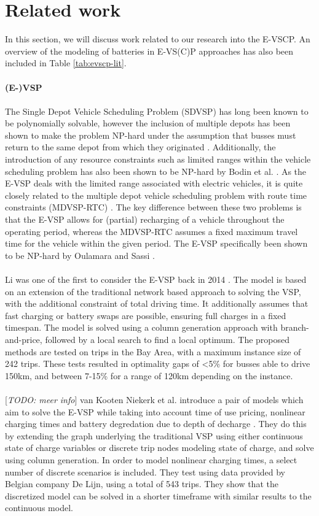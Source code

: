 \documentclass[]{article}
\newcommand{\todo}[1]{{\color{red}[\textit{TODO: #1}]}}
\begin{document}
\section{Related work}
In this section, we will discuss work related to our research into the E-VSCP.  An overview of the modeling of batteries in E-VS(C)P approaches has also been included in Table \ref{tab:evscp-lit}.  \\\\ 
\noindent \textbf{(E-)VSP} \\\\
The Single Depot Vehicle Scheduling Problem (SDVSP) has long been known to be polynomially solvable, however the inclusion of multiple depots has been shown to make the problem NP-hard under the assumption that busses must return to the same depot from which they originated \cite{Bunte2009}. Additionally, the introduction of any resource constraints such as limited ranges within the vehicle scheduling problem has also been shown to be NP-hard by Bodin et al. \cite{BODIN198363}. As the E-VSP deals with the limited range associated with electric vehicles, it is quite closely related to the multiple depot vehicle scheduling problem with route time constraints (MDVSP-RTC) \cite{HAGHANI2002309}. The key difference between these two problems is that the E-VSP allows for (partial) recharging of a vehicle throughout the operating period, whereas the MDVSP-RTC assumes a fixed maximum travel time for the vehicle within the given period. The E-VSP specifically been shown to be NP-hard by Oulamara and Sassi \cite{Sassi2014}. \\\\
\cite{HAGHANI2002309}
Li was one of the first to consider the E-VSP back in 2014 \cite{Li2014}. The model is based on an extension of the traditional network based approach to solving the VSP, with the additional constraint of total driving time. It additionally assumes that fast charging or battery swaps are possible, ensuring full charges in a fixed timespan. The model is solved using a column generation approach with branch-and-price, followed by a local search to find a local optimum. The proposed methods are tested on trips in the Bay Area, with a maximum instance size of 242 trips. These tests resulted in optimality gaps of <5\% for busses able to drive 150km, and between 7-15\% for a range of 120km depending on the instance.  \\\\
\todo{meer info} van Kooten Niekerk et al. introduce a pair of models which aim to solve the E-VSP while taking into account time of use pricing, nonlinear charging times and battery degredation due to depth of decharge \cite{vanKootenNiekerk2017}. They do this by extending the graph underlying the traditional VSP using either continuous state of charge variables or discrete trip nodes modeling state of charge, and solve using column generation. In order to model nonlinear charging times, a select number of discrete scenarios is included. They test using data provided by Belgian company De Lijn, using a total of 543 trips. They show that the discretized model can be solved in a shorter timeframe with similar results to the continuous model. \\\\
\end{document}
